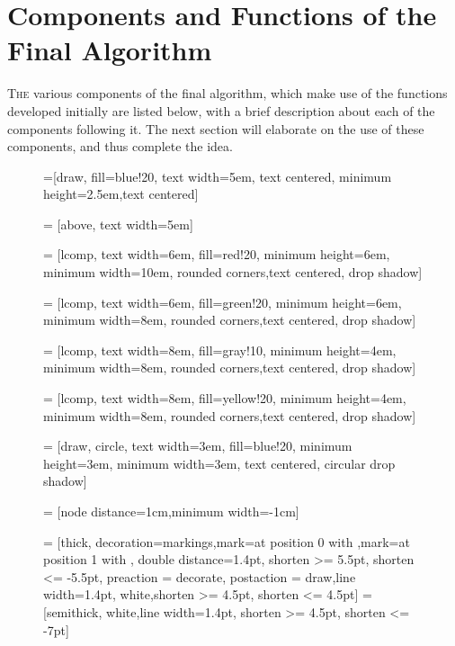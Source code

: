 \section{Components and Functions of the Final Algorithm}

\lettrine[nindent=-0pt]{T}{he} various components of the final algorithm, which make use of the functions developed initially are listed below, with a brief description about each of the components following it. The next section will elaborate on the use of these components, and thus complete the idea.

\begin{figure}[!h]

=[draw, fill=blue!20, text width=5em, 
    text centered, minimum height=2.5em,text centered]

 = [above, text width=5em]

 = [lcomp, text width=6em, fill=red!20, 
    minimum height=6em, minimum width=10em, rounded corners,text centered, drop shadow]

 = [lcomp, text width=6em,
    fill=green!20, minimum height=6em, minimum width=8em, rounded corners,text centered, drop shadow]

 = [lcomp, text width=8em, fill=gray!10, 
    minimum height=4em, minimum width=8em, rounded corners,text centered, drop shadow]

 = [lcomp, text width=8em, fill=yellow!20, 
    minimum height=4em, minimum width=8em, rounded corners,text centered, drop shadow]

 = [draw, circle, text width=3em, fill=blue!20,
	minimum height=3em, minimum width=3em, text centered, circular drop shadow]

 = [node distance=1cm,minimum width=-1cm]

 = [thick, decoration={markings,mark=at position 0 with {},mark=at position
   1 with {}},
   double distance=1.4pt, shorten >= 5.5pt, shorten <= -5.5pt,
   preaction = {decorate},
   postaction = {draw,line width=1.4pt, white,shorten >= 4.5pt, shorten <= 4.5pt}]
 = [semithick, white,line width=1.4pt, shorten >= 4.5pt, shorten <= -7pt]


\end{figure}
